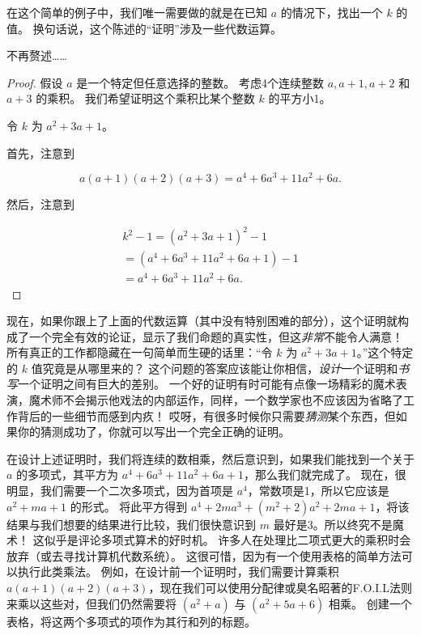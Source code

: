 在这个简单的例子中，我们唯一需要做的就是在已知 $a$ 的情况下，找出一个 $k$ 的值。
换句话说，这个陈述的“证明”涉及一些代数运算。

不再赘述……

\begin{proof}
      假设 $a$ 是一个特定但任意选择的整数。
      考虑4个连续整数 $a, a+1, a+2$ 和 $a+3$ 的乘积。
      我们希望证明这个乘积比某个整数 $k$ 的平方小1。

      令 $k$ 为 $a^2+3a+1$。

      首先，注意到

      \[  a(a+1)(a+2)(a+3) = a^4 + 6a^3 + 11a^2 + 6a.
      \]

      然后，注意到

      \begin{gather*}
            k^2 - 1 = (a^2 + 3a +1)^2 - 1 \\
            = (a^4  + 6a^3 + 11a^2 + 6a + 1) - 1 \\
            = a^4 + 6a^3 + 11a^2 + 6a.
      \end{gather*}

\end{proof}

现在，如果你跟上了上面的代数运算（其中没有特别困难的部分），这个证明就构成了一个完全有效的论证，显示了我们命题的真实性，但这\emph{非常}不能令人满意！
所有真正的工作都隐藏在一句简单而生硬的话里：“令 $k$ 为 $a^2+3a+1$。”这个特定的 $k$ 值究竟是从哪里来的？
这个问题的答案应该能让你相信，\emph{设计}一个证明和\emph{书写}一个证明之间有巨大的差别。
一个好的证明有时可能有点像一场精彩的魔术表演，魔术师不会揭示他戏法的内部运作，同样，一个数学家也不应该因为省略了工作背后的一些细节而感到内疚！
哎呀，有很多时候你只需要\emph{猜测}某个东西，但如果你的猜测成功了，你就可以写出一个完全正确的证明。

在设计上述证明时，我们将连续的数相乘，然后意识到，如果我们能找到一个关于 $a$ 的多项式，其平方为 $a^4  + 6a^3 + 11a^2 + 6a + 1$，那么我们就完成了。
现在，很明显，我们需要一个二次多项式，因为首项是 $a^4$，常数项是1，所以它应该是 $a^2 + ma + 1$ 的形式。
将此平方得到 $a^4 + 2ma^3 + (m^2+2)a^2 + 2ma + 1$，将该结果与我们想要的结果进行比较，我们很快意识到 $m$ 最好是3。所以终究不是魔术！
这似乎是评论多项式算术的好时机。
许多人在处理比二项式更大的乘积时会放弃（或去寻找计算机代数系统）。
这很可惜，因为有一个使用表格的简单方法可以执行此类乘法。
例如，在设计前一个证明时，我们需要计算乘积 $a(a+1)(a+2)(a+3)$，现在我们可以使用分配律或臭名昭著的F.O.I.L法则来乘以这些对，但我们仍然需要将 $(a^2+a)$ 与 $(a^2+5a+6)$ 相乘。
创建一个表格，将这两个多项式的项作为其行和列的标题。

